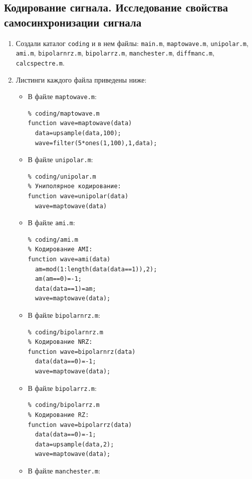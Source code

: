 \subsection{Кодирование сигнала. Исследование свойства самосинхронизации сигнала}
\begin{enumerate}
    \item Создали каталог \texttt{coding} и в нем файлы: \texttt{main.m},
        \texttt{maptowave.m}, \texttt{unipolar.m}, \texttt{ami.m},
        \texttt{bipolarnrz.m}, \texttt{bipolarrz.m}, \texttt{manchester.m},
        \texttt{diffmanc.m}, \texttt{calcspectre.m}.
    \item Листинги каждого файла приведены ниже:
        \begin{itemize}
        \item В файле \texttt{maptowave.m}:
            \begin{verbatim}
% coding/maptowave.m
function wave=maptowave(data)
  data=upsample(data,100);
  wave=filter(5*ones(1,100),1,data);
            \end{verbatim}
        \item В файле \texttt{unipolar.m}:
            \begin{verbatim}
% coding/unipolar.m
% Униполярное кодирование:
function wave=unipolar(data)
  wave=maptowave(data)
            \end{verbatim}
        \item В файле \texttt{ami.m}:
            \begin{verbatim}
% coding/ami.m
% Кодирование AMI:
function wave=ami(data)
  am=mod(1:length(data(data==1)),2);
  am(am==0)=-1;
  data(data==1)=am;
  wave=maptowave(data);
            \end{verbatim}
        \item В файле \texttt{bipolarnrz.m}:
            \begin{verbatim}
% coding/bipolarnrz.m
% Кодирование NRZ:
function wave=bipolarnrz(data)
  data(data==0)=-1;
  wave=maptowave(data);
            \end{verbatim}
        \item В файле \texttt{bipolarrz.m}:
            \begin{verbatim}
% coding/bipolarrz.m
% Кодирование RZ:
function wave=bipolarrz(data)
  data(data==0)=-1;
  data=upsample(data,2);
  wave=maptowave(data);
            \end{verbatim}
        \item В файле \texttt{manchester.m}:
            \begin{verbatim}

\end{verbatim}
\end{itemize}
\end{enumerate}
